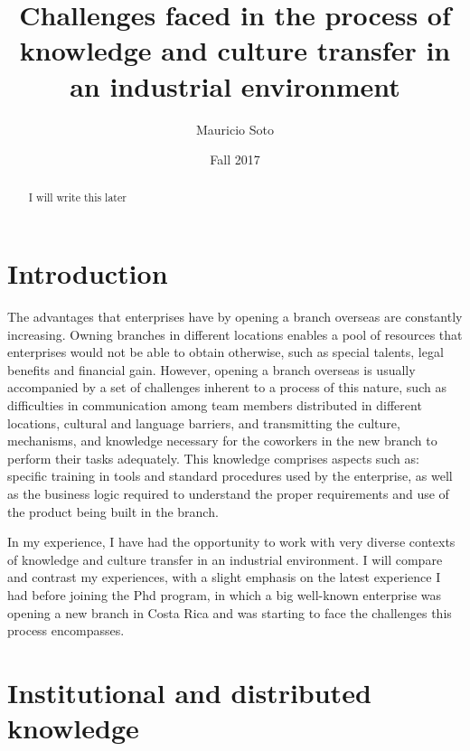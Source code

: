 \documentclass[12pt, letterpaper]{article}
\title{Challenges faced in the process of knowledge and culture transfer in an industrial environment}
\author{Mauricio Soto}
\date{Fall 2017}
\begin{document}
 
\begin{titlepage}
\maketitle
\end{titlepage}

\begin{abstract}
I will write this later
\end{abstract}
 
 
\section{Introduction}

The advantages that enterprises have by opening a branch overseas are constantly increasing.
Owning branches in different locations enables a pool of resources that enterprises would not be able
to obtain otherwise, such as special talents, legal benefits and financial gain. However, 
opening a branch overseas is usually accompanied by a set of challenges inherent to a process of this nature, such as 
difficulties in communication among team members distributed in different locations, 
cultural and language barriers, and transmitting the culture, mechanisms, and knowledge necessary for the 
coworkers in the new branch to perform their tasks adequately. 
This knowledge comprises aspects such as: specific training in tools and standard procedures used by the enterprise, as well as the
business logic required to understand the proper requirements and use of the product being built
in the branch.

In my experience, I have had the opportunity to work with very diverse contexts of knowledge and culture transfer in 
an industrial environment. I will compare and contrast my experiences, with a slight emphasis on the 
latest experience I had before joining the Phd program, in which a big well-known enterprise was 
opening a new branch in Costa Rica and was starting to face the challenges this process encompasses.  




 




\section{Institutional and distributed knowledge}
  

\cite{monperrus11} 
\end{document}
